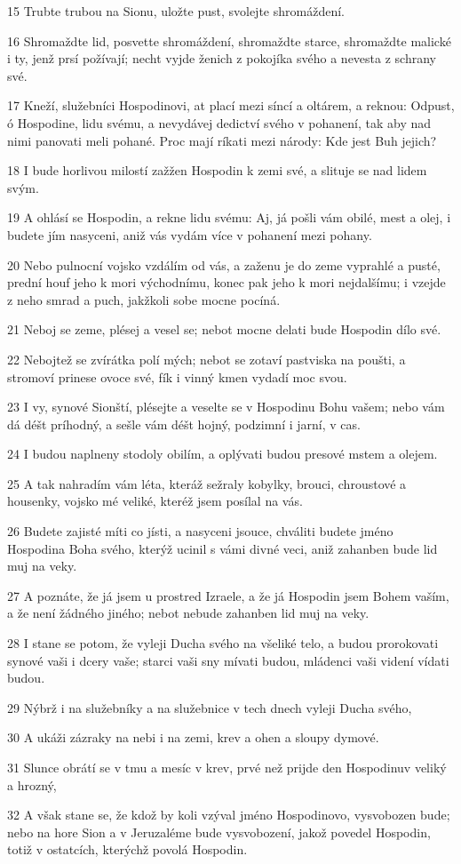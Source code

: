 \par 15 Trubte trubou na Sionu, uložte pust, svolejte shromáždení.
\par 16 Shromaždte lid, posvette shromáždení, shromaždte starce, shromaždte malické i ty, jenž prsí požívají; necht vyjde ženich z pokojíka svého a nevesta z schrany své.
\par 17 Kneží, služebníci Hospodinovi, at plací mezi síncí a oltárem, a reknou: Odpust, ó Hospodine, lidu svému, a nevydávej dedictví svého v pohanení, tak aby nad nimi panovati meli pohané. Proc mají ríkati mezi národy: Kde jest Buh jejich?
\par 18 I bude horlivou milostí zažžen Hospodin k zemi své, a slituje se nad lidem svým.
\par 19 A ohlásí se Hospodin, a rekne lidu svému: Aj, já pošli vám obilé, mest a olej, i budete jím nasyceni, aniž vás vydám více v pohanení mezi pohany.
\par 20 Nebo pulnocní vojsko vzdálím od vás, a zaženu je do zeme vyprahlé a pusté, prední houf jeho k mori východnímu, konec pak jeho k mori nejdalšímu; i vzejde z neho smrad a puch, jakžkoli sobe mocne pocíná.
\par 21 Neboj se zeme, plésej a vesel se; nebot mocne delati bude Hospodin dílo své.
\par 22 Nebojtež se zvírátka polí mých; nebot se zotaví pastviska na poušti, a stromoví prinese ovoce své, fík i vinný kmen vydadí moc svou.
\par 23 I vy, synové Sionští, plésejte a veselte se v Hospodinu Bohu vašem; nebo vám dá déšt príhodný, a sešle vám déšt hojný, podzimní i jarní, v cas.
\par 24 I budou naplneny stodoly obilím, a oplývati budou presové mstem a olejem.
\par 25 A tak nahradím vám léta, kteráž sežraly kobylky, brouci, chroustové a housenky, vojsko mé veliké, kteréž jsem posílal na vás.
\par 26 Budete zajisté míti co jísti, a nasyceni jsouce, chváliti budete jméno Hospodina Boha svého, kterýž ucinil s vámi divné veci, aniž zahanben bude lid muj na veky.
\par 27 A poznáte, že já jsem u prostred Izraele, a že já Hospodin jsem Bohem vaším, a že není žádného jiného; nebot nebude zahanben lid muj na veky.
\par 28 I stane se potom, že vyleji Ducha svého na všeliké telo, a budou prorokovati synové vaši i dcery vaše; starci vaši sny mívati budou, mládenci vaši videní vídati budou.
\par 29 Nýbrž i na služebníky a na služebnice v tech dnech vyleji Ducha svého,
\par 30 A ukáži zázraky na nebi i na zemi, krev a ohen a sloupy dymové.
\par 31 Slunce obrátí se v tmu a mesíc v krev, prvé než prijde den Hospodinuv veliký a hrozný,
\par 32 A však stane se, že kdož by koli vzýval jméno Hospodinovo, vysvobozen bude; nebo na hore Sion a v Jeruzaléme bude vysvobození, jakož povedel Hospodin, totiž v ostatcích, kterýchž povolá Hospodin.

